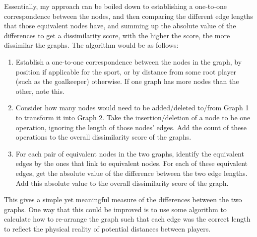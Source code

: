 \documentclass[a4paper,11pt]{article}
\begin{document}
Essentially, my approach can be boiled down to establishing a one-to-one correspondence between the nodes, and then comparing 
the different edge lengths that those equivalent nodes have, and summing up the absolute value of the differences to get a 
dissimilarity score, with the higher the score, the more dissimilar the graphs.
The algorithm would be as follows:
\begin{enumerate}
    \item   Establish a one-to-one correspondence between the nodes in the graph, by position if applicable for the sport, 
            or by distance from some root player (such as the goalkeeper) otherwise.
            If one graph has more nodes than the other, note this.

    \item   Consider how many nodes would need to be added/deleted to/from Graph 1 to transform it into Graph 2. 
            Take the insertion/deletion of a node to be one operation, ignoring the length of those nodes' edges.
            Add the count of these operations to the overall dissimilarity score of the graphs.

    \item   For each pair of equivalent nodes in the two graphs, identify the equivalent edges by the ones that link to
            equivalent nodes.
            For each of these equivalent edges, get the absolute value of the difference between the two edge lengths. 
            Add this absolute value to the overall dissimilarity score of the graph.
\end{enumerate}

This gives a simple yet meaningful measure of the differences between the two graphs.
One way that this could be improved is to use some algorithm to calculate how to re-arrange the graph such that each 
edge was the correct length to reflect the physical reality of potential distances between players.
\end{document}
